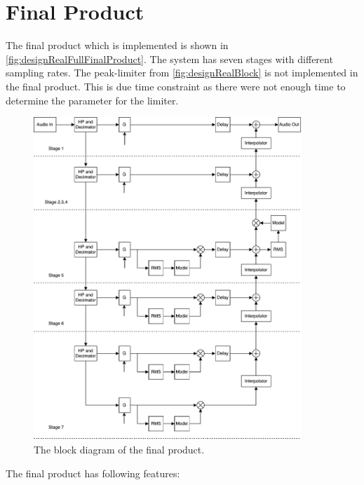 \chapter{Final Product}

The final product which is implemented is shown in \autoref{fig:designRealFullFinalProduct}. The system has seven stages with different sampling rates. The peak-limiter from \autoref{fig:designRealBlock} is not implemented in the final product. This is due time constraint as there were not enough time to determine the parameter for the limiter.

\begin{figure}[H]
\centering
\includegraphics[width=0.9\textwidth]{figures/designRealFullFinalProduct.pdf}
\caption{The block diagram of the final product.}
\label{fig:designRealFullFinalProduct}
\end{figure}

The final product has following features:

